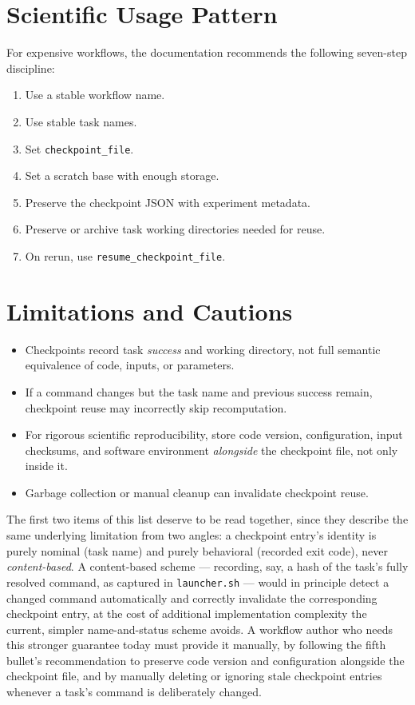 \section{Scientific Usage Pattern}

For expensive workflows, the documentation recommends the following
seven-step discipline:

\begin{enumerate}[leftmargin=1.6em]
  \item Use a stable workflow name.
  \item Use stable task names.
  \item Set \texttt{checkpoint\_file}.
  \item Set a scratch base with enough storage.
  \item Preserve the checkpoint JSON with experiment metadata.
  \item Preserve or archive task working directories needed for reuse.
  \item On rerun, use \texttt{resume\_checkpoint\_file}.
\end{enumerate}

\section{Limitations and Cautions}

\begin{cautionbox}
\begin{itemize}[leftmargin=1.4em]
  \item Checkpoints record task \emph{success} and working directory, not
    full semantic equivalence of code, inputs, or parameters.
  \item If a command changes but the task name and previous success remain,
    checkpoint reuse may incorrectly skip recomputation.
  \item For rigorous scientific reproducibility, store code version,
    configuration, input checksums, and software environment \emph{alongside}
    the checkpoint file, not only inside it.
  \item Garbage collection or manual cleanup can invalidate checkpoint
    reuse.
\end{itemize}
\end{cautionbox}

The first two items of this list deserve to be read together, since they
describe the same underlying limitation from two angles: a checkpoint
entry's identity is purely nominal (task name) and purely behavioral
(recorded exit code), never \emph{content-based}. A content-based scheme
--- recording, say, a hash of the task's fully resolved command, as
captured in \texttt{launcher.sh} --- would in principle detect a changed
command automatically and correctly invalidate the corresponding checkpoint
entry, at the cost of additional implementation complexity the current,
simpler name-and-status scheme avoids. A workflow author who needs this
stronger guarantee today must provide it manually, by following the fifth
bullet's recommendation to preserve code version and configuration
alongside the checkpoint file, and by manually deleting or ignoring stale
checkpoint entries whenever a task's command is deliberately changed.

